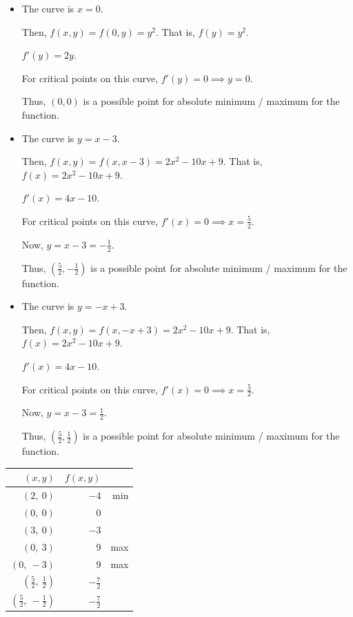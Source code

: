 \begin{itemize}
    \item 
    
    The curve is $x = 0$. 

    Then, $f(x, y) = f(0, y) = y^2$. That is, $f(y) = y^2$. 

    $f'(y) = 2y$. 
        
    For critical points on this curve, $f'(y) = 0 \implies y = 0$. 

    Thus, $(0,0)$ is a possible point for absolute minimum / maximum for the function. 

    \item {\color{orange}
    
    The curve is $y = x - 3$. 

    Then, $f(x, y) = f(x, x-3) = 2x^2 - 10x + 9$. That is, $f(x) = 2x^2 - 10x + 9$.

    $f'(x) = 4x - 10$.

    For critical points on this curve, $f'(x) = 0 \implies x = \frac{5}{2}$. 

    Now, $y = x - 3 = -\frac{1}{2}$.

    Thus, $(\frac{5}{2}, -\frac{1}{2})$ is a possible point for absolute minimum / maximum for the function. 

    } \item \color{DarkGreen}
    
    The curve is $y = -x + 3$. 

    Then, $f(x, y) = f(x, -x+3) = 2x^2 - 10x + 9$. That is, $f(x) = 2x^2 - 10x + 9$.

    $f'(x) = 4x - 10$.

    For critical points on this curve, $f'(x) = 0 \implies x = \frac{5}{2}$. 

    Now, $y = x - 3 = \frac{1}{2}$.

    Thus, $(\frac{5}{2}, \frac{1}{2})$ is a possible point for absolute minimum / maximum for the function. 
\end{itemize}

\begin{center}
    \begin{tabular}{r | r r}
        $(x, y)$                      & $f(x, y)$            \\
        \hline
        $(2,~0)$                      & $-4$           & min \\
        $(0,~0)$                      & $0$                  \\
        $(3,~0)$                      & $-3$                 \\
        $(0,~3)$                      & $9$            & max \\
        $(0,~-3)$                     & $9$            & max \\
        \rule{0pt}{0.25cm}
        $(\frac{5}{2},~\frac{1}{2})$  & $-\frac{7}{2}$       \\
        \rule{0pt}{0.75cm}
        $(\frac{5}{2},~-\frac{1}{2})$ & $-\frac{7}{2}$       \\
    \end{tabular}
\end{center}

